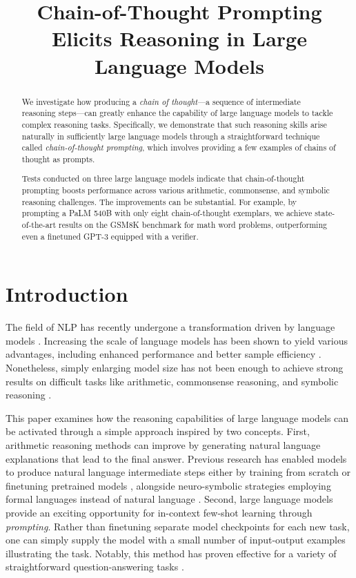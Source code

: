 \title{Chain-of-Thought Prompting Elicits Reasoning in Large Language Models}

\begin{abstract}
We investigate how producing a \textit{chain of thought}—a sequence of intermediate reasoning steps—can greatly enhance the capability of large language models to tackle complex reasoning tasks. Specifically, we demonstrate that such reasoning skills arise naturally in sufficiently large language models through a straightforward technique called \textit{chain-of-thought prompting}, which involves providing a few examples of chains of thought as prompts.

Tests conducted on three large language models indicate that chain-of-thought prompting boosts performance across various arithmetic, commonsense, and symbolic reasoning challenges. The improvements can be substantial. For example, by prompting a PaLM 540B with only eight chain-of-thought exemplars, we achieve state-of-the-art results on the GSM8K benchmark for math word problems, outperforming even a finetuned GPT-3 equipped with a verifier.
\end{abstract}

\section{Introduction}
The field of NLP has recently undergone a transformation driven by language models \citep[][\textit{inter alia}]{peters-etal-2018-deep,devlin-etal-2019-bert,brown2020language}. Increasing the scale of language models has been shown to yield various advantages, including enhanced performance and better sample efficiency \citep[\textit{inter alia}]{kaplan2020scaling,brown2020language}. Nonetheless, simply enlarging model size has not been enough to achieve strong results on difficult tasks like arithmetic, commonsense reasoning, and symbolic reasoning \citep{rae2021scaling}.

This paper examines how the reasoning capabilities of large language models can be activated through a simple approach inspired by two concepts. First, arithmetic reasoning methods can improve by generating natural language explanations that lead to the final answer. Previous research has enabled models to produce natural language intermediate steps either by training from scratch \citep{ling-etal-2017-program} or finetuning pretrained models \citep{cobbe2021training}, alongside neuro-symbolic strategies employing formal languages instead of natural language \citep{roy-roth-2015-solving, chiang-chen-2019-semantically,amini-etal-2019-mathqa, chen2019neural}. Second, large language models provide an exciting opportunity for in-context few-shot learning through \emph{prompting}. Rather than finetuning separate model checkpoints for each new task, one can simply supply the model with a small number of input-output examples illustrating the task. Notably, this method has proven effective for a variety of straightforward question-answering tasks \citep{brown2020language}.

